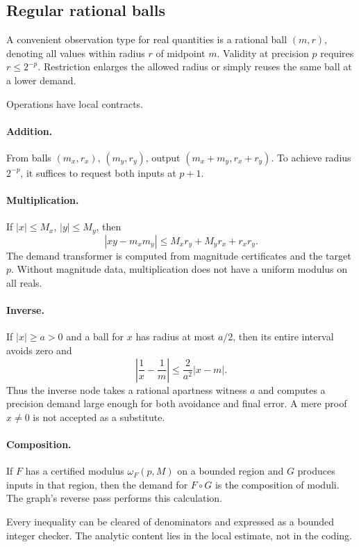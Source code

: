\subsection{Regular rational balls}

A convenient observation type for real quantities is a rational ball
\((m,r)\), denoting all values within radius \(r\) of midpoint \(m\).  Validity
at precision \(p\) requires \(r\leq2^{-p}\).  Restriction enlarges the allowed
radius or simply reuses the same ball at a lower demand.

Operations have local contracts.

\paragraph{Addition.}
From balls \((m_x,r_x)\), \((m_y,r_y)\), output
\((m_x+m_y,r_x+r_y)\).  To achieve radius \(2^{-p}\), it suffices to request
both inputs at \(p+1\).

\paragraph{Multiplication.}
If \(|x|\leq M_x\), \(|y|\leq M_y\), then
\[
 |xy-m_xm_y|
 \leq M_xr_y+M_yr_x+r_xr_y.
\]
The demand transformer is computed from magnitude certificates and the target
\(p\).  Without magnitude data, multiplication does not have a uniform modulus
on all reals.

\paragraph{Inverse.}
If \(|x|\geq a>0\) and a ball for \(x\) has radius at most \(a/2\), then its
entire interval avoids zero and
\[
 \left|\frac1x-\frac1m\right|
 \leq \frac{2}{a^2}|x-m|.
\]
Thus the inverse node takes a rational apartness witness \(a\) and computes a
precision demand large enough for both avoidance and final error.  A mere
proof \(x\neq0\) is not accepted as a substitute.

\paragraph{Composition.}
If \(F\) has a certified modulus \(\omega_F(p,M)\) on a bounded region and
\(G\) produces inputs in that region, then the demand for \(F\circ G\) is the
composition of moduli.  The graph's reverse pass performs this calculation.

Every inequality can be cleared of denominators and expressed as a bounded
integer checker.  The analytic content lies in the local estimate, not in the
coding.

